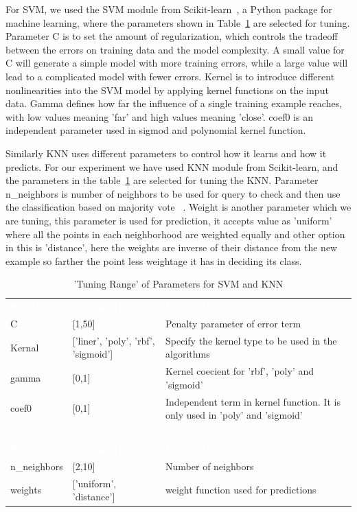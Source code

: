 \documentclass[sigconf]{acmart}
\theoremstyle{break}
\begin{document}
    
    For SVM, we used the SVM module from Scikit-learn~\cite{pedregosa2011scikit}, a Python package for machine learning, where the parameters shown in Table~\ref{tab:DE_Parameters} are selected for tuning. Parameter C is to set the amount of regularization, which controls the tradeoff between the errors on training data and the model complexity. A small value for C will generate a simple model with more training errors, while a large value will lead to a complicated model with fewer errors. Kernel is to introduce different nonlinearities into the SVM model by applying kernel functions on the input data. Gamma defines how far the influence of a single training example reaches, with low values meaning 'far' and high values meaning 'close'. coef0 is an independent parameter used in sigmod and polynomial kernel function.
    
    Similarly KNN uses different parameters to control how it learns and how it predicts. For our experiment we have used KNN module from Scikit-learn, and the parameters in the table~\ref{tab:DE_Parameters} are selected for tuning the KNN. Parameter n\_neighbors is number of neighbors to be used for query to check and then use the classification based on majority vote ~\cite{guo2003knn}. Weight is another parameter which we are tuning, this parameter is used for prediction, it accepts value as 'uniform' where all the points in each neighborhood are weighted equally and other option in this is 'distance', here the weights are inverse of their distance from the new example so farther the point less weightage it has in deciding its class.
    
    \begin{table}[h!]
    \small
        \centering
       \begin{tabular}{p{1.4cm}|p{2cm}|p{4.1cm}}
         \rowcolor{darkgray} \textcolor{white}{\textbf{SVM}}      & \textcolor{white}{\textbf{Tuning Range }} & \textcolor{white}{\textbf{Description}} \\
            C & [1,50] & Penalty parameter of  error term \\ 
            \rowcolor{lightgray} Kernal & ['liner', 'poly', 'rbf', 'sigmoid'] & Specify the kernel type to be used in the algorithms \\ 
            gamma & [0,1] & Kernel coecient for 'rbf', 'poly' and 'sigmoid' \\ 
             \rowcolor{lightgray}coef0 & [0,1] & Independent term in kernel function. It is only used in 'poly' and 'sigmoid' \\
            \multicolumn{1}{c}{~}\\
            \rowcolor{darkgray} \textcolor{white}{\textbf{KNN}} & \textcolor{white}{\textbf{Tuning Range }} & \textcolor{white}{\textbf{Description}} \\ 
            n\_neighbors & [2,10] & Number of neighbors \\ 
            \rowcolor{lightgray} weights & ['uniform', 'distance'] & weight function used for predictions 
        \end{tabular}    
        \caption{'Tuning Range' of Parameters for SVM and KNN}
        \label{tab:DE_Parameters}
    \end{table}
    
\end{document}
